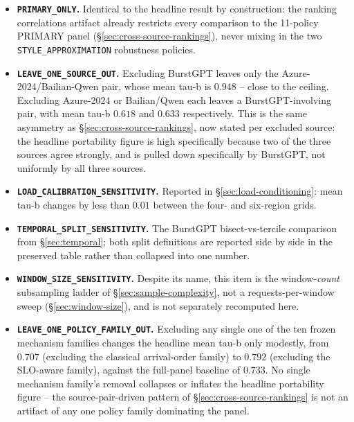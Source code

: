 \begin{itemize}
  \item \textbf{\texttt{PRIMARY\_ONLY}.} Identical to the headline result
    by construction: the ranking correlations artifact already restricts
    every comparison to the 11-policy PRIMARY panel
    (\S\ref{sec:cross-source-rankings}), never mixing in the two
    \texttt{STYLE\_APPROXIMATION} robustness policies.
  \item \textbf{\texttt{LEAVE\_ONE\_SOURCE\_OUT}.} Excluding BurstGPT
    leaves only the Azure-2024/Bailian-Qwen pair, whose mean tau-b is
    $0.948$ -- close to the ceiling. Excluding Azure-2024 or Bailian/Qwen
    each leaves a BurstGPT-involving pair, with mean tau-b $0.618$ and
    $0.633$ respectively. This is the same asymmetry as
    \S\ref{sec:cross-source-rankings}, now stated per excluded source: the
    headline portability figure is high specifically because two of the
    three sources agree strongly, and is pulled down specifically by
    BurstGPT, not uniformly by all three sources.
  \item \textbf{\texttt{LOAD\_CALIBRATION\_SENSITIVITY}.} Reported in
    \S\ref{sec:load-conditioning}: mean tau-b changes by less than $0.01$
    between the four- and six-region grids.
  \item \textbf{\texttt{TEMPORAL\_SPLIT\_SENSITIVITY}.} The BurstGPT
    bisect-vs-tercile comparison from \S\ref{sec:temporal}; both split
    definitions are reported side by side in the preserved table rather
    than collapsed into one number.
  \item \textbf{\texttt{WINDOW\_SIZE\_SENSITIVITY}.} Despite its name,
    this item is the window-\emph{count} subsampling ladder of
    \S\ref{sec:sample-complexity}, not a requests-per-window sweep
    (\S\ref{sec:window-size}), and is not separately recomputed here.
  \item \textbf{\texttt{LEAVE\_ONE\_POLICY\_FAMILY\_OUT}.} Excluding any
    single one of the ten frozen mechanism families changes the headline
    mean tau-b only modestly, from $0.707$ (excluding the classical
    arrival-order family) to $0.792$ (excluding the SLO-aware family),
    against the full-panel baseline of $0.733$. No single mechanism
    family's removal collapses or inflates the headline portability
    figure -- the source-pair-driven pattern of
    \S\ref{sec:cross-source-rankings} is not an artifact of any one
    policy family dominating the panel.
\end{itemize}

